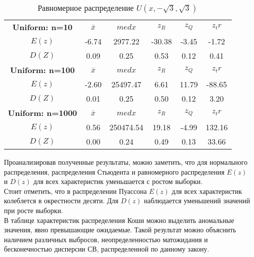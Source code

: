 \documentclass[14pt]{extarticle}
\begin{document}
\begin{table}[htbp]
    \centering
    \begin{tabular}{|c|c|c|c|c|c|}
        \toprule
        \textbf{Uniform: n=10} & \(\overline{x}\) & \(med x\) & \(z_R\) & \(z_Q\) & \(z_tr\)\\
        \(E(z)\) & -6.74 & 2977.22 & -30.38 & -3.45 & -1.72  \\
        \(D(Z)\) & 0.09 & 0.25 & 0.53 & 0.12 & 0.41 \\
        \midrule
  	\textbf{Uniform: n=100} & \(\overline{x}\) & \(med x\) & \(z_R\) & \(z_Q\) & \(z_tr\)\\
        \(E(z)\) & -2.60 & 25497.47 & 6.61 & 11.79 & -88.65  \\
        \(D(Z)\) & 0.01 & 0.25 & 0.50 & 0.12 & 3.20 \\
        \midrule
	\textbf{Uniform: n=1000} & \(\overline{x}\)& \(med x\) & \(z_R\) & \(z_Q\) & \(z_tr\)\\
        \(E(z)\) & 0.56 & 250474.54 & 19.18 & -4.99 & 132.16 \\
        \(D(Z)\) & 0.00 & 0.24 & 0.49 & 0.13 & 33.66 \\
        \toprule
    \end{tabular}
    \caption{Равномерное распределение \(U(x, -\sqrt{3}, \sqrt{3})\)}
    \label{tab:uniform_t}
\end{table}

Проанализировав полученные результаты, можно заметить, что для нормального распределения, распределения Стьюдента и равномерного распределения \(E(z)\) и \(D(z)\) для всех характеристик уменьшается с ростом выборки.\\
Стоит отметить, что в распределении Пуассона \(E(z)\) для всех характеристик колеблется в окрестности десяти. Для \(D(z)\) наблюдается уменьшений значений при росте выборки.\\
В таблице характеристик распределения Коши можно выделить аномальные значения, явно превышающие ожидаемые. Такой результат можно объяснить наличием различных выбросов, неопределенностью матожидания и бесконечностью дисперсии СВ, распределенной по данному закону.
\end{document}
